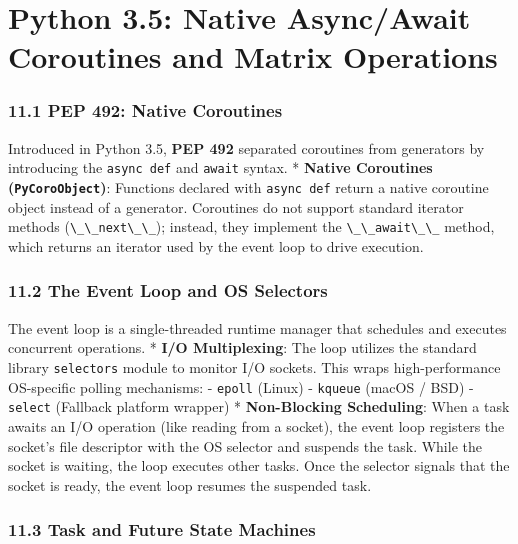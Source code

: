 \hypertarget{python-3.5-native-asyncawait-coroutines-and-matrix-operations}{%
\chapter{Python 3.5: Native Async/Await Coroutines and Matrix
Operations}\label{python-3.5-native-asyncawait-coroutines-and-matrix-operations}}

\hypertarget{pep-492-native-coroutines}{%
\subsection{11.1 PEP 492: Native
Coroutines}\label{pep-492-native-coroutines}}

Introduced in Python 3.5, \textbf{PEP 492} separated coroutines from
generators by introducing the \passthrough{\lstinline!async def!} and
\passthrough{\lstinline!await!} syntax. * \textbf{Native Coroutines
(\passthrough{\lstinline!PyCoroObject!})}: Functions declared with
\passthrough{\lstinline!async def!} return a native coroutine object
instead of a generator. Coroutines do not support standard iterator
methods (\passthrough{\lstinline!\_\_next\_\_!}); instead, they
implement the \passthrough{\lstinline!\_\_await\_\_!} method, which
returns an iterator used by the event loop to drive execution.

\hypertarget{the-event-loop-and-os-selectors}{%
\subsection{11.2 The Event Loop and OS
Selectors}\label{the-event-loop-and-os-selectors}}

The event loop is a single-threaded runtime manager that schedules and
executes concurrent operations. * \textbf{I/O Multiplexing}: The loop
utilizes the standard library \passthrough{\lstinline!selectors!} module
to monitor I/O sockets. This wraps high-performance OS-specific polling
mechanisms: - \passthrough{\lstinline!epoll!} (Linux) -
\passthrough{\lstinline!kqueue!} (macOS / BSD) -
\passthrough{\lstinline!select!} (Fallback platform wrapper) *
\textbf{Non-Blocking Scheduling}: When a task awaits an I/O operation
(like reading from a socket), the event loop registers the socket's file
descriptor with the OS selector and suspends the task. While the socket
is waiting, the loop executes other tasks. Once the selector signals
that the socket is ready, the event loop resumes the suspended task.

\hypertarget{task-and-future-state-machines}{%
\subsection{11.3 Task and Future State
Machines}\label{task-and-future-state-machines}}

